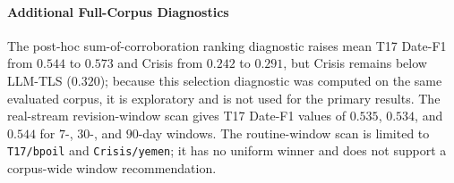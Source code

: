 \documentclass[journal]{IEEEtran}
\begin{document}
\begin{table}[t]
\centering
\caption{Full \textbf{T17} ($n=9$, $3{,}742$ Articles) Component Ablation (Mean $\pm$ Std)}
\label{tab:component_ablation}
\renewcommand{\arraystretch}{1.12}
\end{table}





\paragraph{Additional Full-Corpus Diagnostics}
The post-hoc sum-of-corroboration ranking diagnostic raises mean T17 Date-F1 from $0.544$ to $0.573$ and Crisis from $0.242$ to $0.291$, but Crisis remains below LLM-TLS ($0.320$); because this selection diagnostic was computed on the same evaluated corpus, it is exploratory and is not used for the primary results. The real-stream revision-window scan gives T17 Date-F1 values of $0.535$, $0.534$, and $0.544$ for $7$-, $30$-, and $90$-day windows. The routine-window scan is limited to \texttt{T17/bpoil} and \texttt{Crisis/yemen}; it has no uniform winner and does not support a corpus-wide window recommendation.
\begin{table}[t]
\centering
\caption{Uncached Per-Article Latency ($16$ Embedded Scenarios, $50$ Distractors/Topic)}
\label{tab:latency_study}
\renewcommand{\arraystretch}{1.12}
\end{table}
\end{document}
